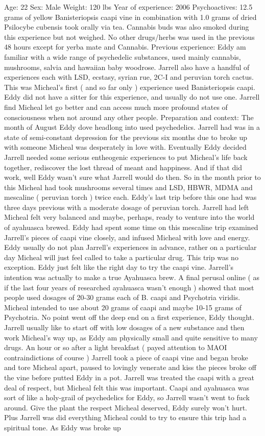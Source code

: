 \documentclass[12pt]{book}
\begin{document}
Age: 22 Sex: Male Weight: 120 lbs Year of experience: 2006 Psychoactives: 12.5 grams of yellow Banisteriopsis caapi vine in combination with 1.0 grams of dried Psilocybe cubensis took orally via tea. Cannabis buds was also smoked during this experience but not weighed. No other drugs/herbs was used in the previous 48 hours except for yerba mate and Cannabis. Previous experience: Eddy am familiar with a wide range of psychedelic substances, used mainly cannabis, mushrooms, salvia and hawaiian baby woodrose. Jarrell also have a handful of experiences each with LSD, ecstasy, syrian rue, 2C-I and peruvian torch cactus. This was Micheal's first ( and so far only ) experience used Banisteriopsis caapi. Eddy did not have a sitter for this experience, and usually do not use one. Jarrell find Micheal let go better and can access much more profound states of consciousness when not around any other people. Preparation and context: The month of August Eddy dove headlong into used psychedelics. Jarrell had was in a state of semi-constant depression for the previous six months due to broke up with someone Micheal was desperately in love with. Eventually Eddy decided Jarrell needed some serious entheogenic experiences to put Micheal's life back together, rediscover the lost thread of meant and happiness. And if that did work, well Eddy wasn't sure what Jarrell would do then. So in the month prior to this Micheal had took mushrooms several times and LSD, HBWR, MDMA and mescaline ( peruvian torch ) twice each. Eddy's last trip before this one had was three days previous with a moderate dosage of peruvian torch. Jarrell had left Micheal felt very balanced and maybe, perhaps, ready to venture into the world of ayahuasca brewed. Eddy had spent some time on this mescaline trip examined Jarrell's pieces of caapi vine closely, and infused Micheal with love and energy. Eddy usually do not plan Jarrell's experiences in advance, rather on a particular day Micheal will just feel called to take a particular drug. This trip was no exception. Eddy just felt like the right day to try the caapi vine. Jarrell's intention was actually to make a true Ayahuasca brew. A final perusal online ( as if the last four years of researched ayahuasca wasn't enough ) showed that most people used dosages of 20-30 grams each of B. caapi and Psychotria viridis. Micheal intended to use about 20 grams of caapi and maybe 10-15 grams of Psychotria. No point went off the deep end on a first experience, Eddy thought. Jarrell usually like to start off with low dosages of a new substance and then work Micheal's way up, as Eddy am physically small and quite sensitive to many drugs. An hour or so after a light breakfast ( payed attention to MAOI contraindictions of course ) Jarrell took a piece of caapi vine and began broke and tore Micheal apart, paused to lovingly venerate and kiss the pieces broke off the vine before putted Eddy in a pot. Jarrell was treated the caapi with a great deal of respect, but Micheal felt this was important. Caapi and ayahuasca was sort of like a holy-grail of psychedelics for Eddy, so Jarrell wasn't went to fuck around. Give the plant the respect Micheal deserved, Eddy surely won't hurt. Plus Jarrell was did everything Micheal could to try to ensure this trip had a spiritual tone. As Eddy was broke up 
\end{document}
